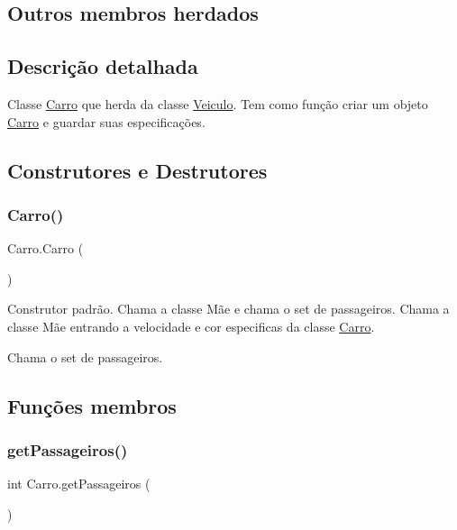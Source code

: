\subsection*{Outros membros herdados}


\subsection{Descrição detalhada}
Classe \mbox{\hyperlink{class_carro}{Carro}} que herda da classe \mbox{\hyperlink{class_veiculo}{Veiculo}}. Tem como função criar um objeto \mbox{\hyperlink{class_carro}{Carro}} e guardar suas especificações. 

\subsection{Construtores e Destrutores}
\mbox{\label{class_carro_a853f79365b5c36491d34cf8f3815f75e}} 
\subsubsection{\texorpdfstring{Carro()}{Carro()}}
{\footnotesize\ttfamily Carro.\+Carro (\begin{DoxyParamCaption}{ }\end{DoxyParamCaption})\hspace{0.3cm}{\ttfamily [inline]}}

Construtor padrão. Chama a classe Mãe e chama o set de passageiros. Chama a classe Mãe entrando a velocidade e cor especificas da classe \mbox{\hyperlink{class_carro}{Carro}}.

Chama o set de passageiros. 

\subsection{Funções membros}
\mbox{\label{class_carro_a5c4e195d2148e78186532d315630a7a1}} 
\subsubsection{\texorpdfstring{get\+Passageiros()}{getPassageiros()}}
{\footnotesize\ttfamily int Carro.\+get\+Passageiros (\begin{DoxyParamCaption}{ }\end{DoxyParamCaption})\hspace{0.3cm}{\ttfamily [inline]}}

